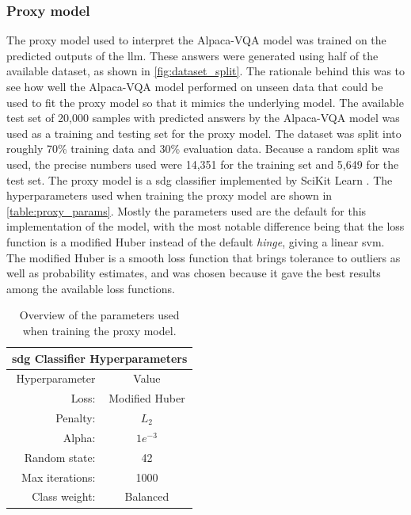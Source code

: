     \subsubsection{Proxy model}
    The proxy model used to interpret the Alpaca-VQA model was trained on the predicted outputs of the \gls{llm}. These answers were generated using half of the available dataset, as shown in \autoref{fig:dataset_split}. The rationale behind this was to see how well the Alpaca-VQA model performed on unseen data that could be used to fit the proxy model so that it mimics the underlying model. 
    The available test set of 20,000 samples with predicted answers by the Alpaca-VQA model was used as a training and testing set for the proxy model. The dataset was split into roughly 70\% training data and 30\% evaluation data. Because a random split was used, the precise numbers used were 14,351 for the training set and 5,649 for the test set.
    The proxy model is a \gls{sdg} classifier implemented by SciKit Learn \cite{SklearnLinearModel}.
    The hyperparameters used when training the proxy model are shown in \autoref{table:proxy_params}. Mostly the parameters used are the default for this implementation of the model, with the most notable difference being that the loss function is a modified Huber instead of the default \textit{hinge}, giving a linear \gls{svm}. 
    The modified Huber is a smooth loss function that brings tolerance to
    outliers as well as probability estimates, and was chosen because it gave the best results among the available loss functions.
    

    \begin{table}[htb]
    \centering
    \begin{tabular}{ r c } 
        \multicolumn{2}{c}{\textbf{\gls{sdg} Classifier Hyperparameters}}\\ 
        \toprule
           Hyperparameter & Value \\
        \midrule
            Loss: & Modified Huber\\
            Penalty: & $L_2$\\
            Alpha: & $1e^{-3}$\\
            Random state: & 42\\
            Max iterations: & 1000\\
            Class weight: & Balanced\\[0.5ex]
        \bottomrule
    \end{tabular}
    \caption[Parameters used when training the proxy model.]{Overview of the parameters used when training the proxy model.}
    \label{table:proxy_params}
    \end{table}
    

